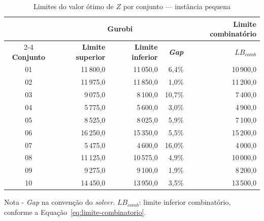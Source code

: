 \begin{table}[H]
    \caption{Limites do valor ótimo de $Z$ por conjunto --- instância pequena}
    \label{tab:res-limites-pequeno}
    \centering
    \begin{tabular}{crrrr}
        \hline
        & \multicolumn{3}{c}{\textbf{Gurobi}} & \textbf{Limite combinatório} \\
        \cline{2-4} \cline{5-5}
        \textbf{Conjunto} & \textbf{Limite superior} & \textbf{Limite inferior} & \textbf{\textit{Gap}} & \textbf{$LB_{comb}$} \\
        \hline
        01 & 11\,800,0 & 11\,050,0 & 6,4\% & 10\,900,0 \\
        02 & 11\,975,0 & 11\,850,0 & 1,0\% & 11\,200,0 \\
        03 & 9\,075,0 & 8\,100,0 & 10,7\% & 7\,400,0 \\
        04 & 5\,775,0 & 5\,600,0 & 3,0\% & 4\,900,0 \\
        05 & 8\,525,0 & 8\,025,0 & 5,9\% & 7\,100,0 \\
        06 & 16\,250,0 & 15\,350,0 & 5,5\% & 15\,200,0 \\
        07 & 5\,475,0 & 4\,600,0 & 16,0\% & 4\,000,0 \\
        08 & 11\,125,0 & 10\,575,0 & 4,9\% & 10\,000,0 \\
        09 & 9\,275,0 & 9\,100,0 & 1,9\% & 8\,200,0 \\
        10 & 14\,450,0 & 13\,950,0 & 3,5\% & 13\,500,0 \\
        \hline
    \end{tabular}
    \par\smallskip
    {\footnotesize Nota - \textit{Gap} na convenção do \textit{solver}. $LB_{comb}$: limite inferior combinatório, conforme a Equação~\eqref{eq:limite-combinatorio}.}
\end{table}

